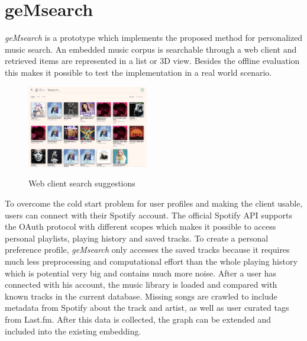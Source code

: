\documentclass[a4paper]{llncs}
\begin{document}
	\section{geMsearch}
	\emph{geMsearch} is a prototype which implements the proposed method for personalized music search. An embedded music corpus is searchable through a web client and retrieved items are represented in a list or 3D view. Besides the offline evaluation this makes it possible to test the implementation in a real world scenario. 
	
	
	
	\begin{figure}[ht]
		{\includegraphics[width=200px]{web_client.png}}	
		\caption{Web client search suggestions}
		\label{fig:web_client}
	\end{figure}
		
	
	\label{sec:impl_spotify_connect}
	To overcome the cold start problem for user profiles and making the client usable, users can connect with their Spotify account. The official Spotify API supports the OAuth protocol with different scopes which makes it possible to access personal playlists, playing history and saved tracks. To create a personal preference profile, \emph{geMsearch} only accesses the saved tracks because it requires much less preprocessing and computational effort than the whole playing history which is potential very big and contains much more noise. After a user has connected with his account, the music library is loaded and compared with known tracks in the current database. Missing songs are crawled to include metadata from Spotify about the track and artist, as well as user curated tags from Last.fm. After this data is collected, the graph can be extended and included into the existing embedding.
	
\end{document}
